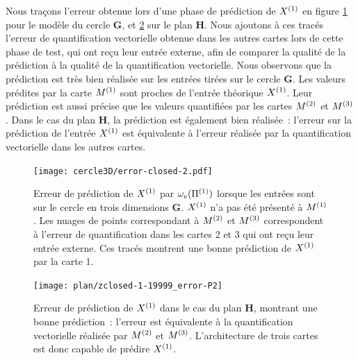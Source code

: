 \documentclass[../main]{subfiles}
\begin{document}
Nous traçons l'erreur obtenue lors d'une phase de prédiction de $X^{({1})}$ en figure \ref{fig:pred_cercle} pour le modèle du cercle \textbf{G}, et \ref{fig:plan3_pred} sur le plan \textbf{H}.
Nous ajoutons à ces tracés l'erreur de quantification vectorielle obtenue dans les autres cartes lors de cette phase de test, qui ont reçu leur entrée externe, afin de comparer la qualité de la prédiction à la qualité de la quantification vectorielle.
Nous observons que la prédiction est très bien réalisée sur les entrées tirées sur le cercle \textbf{G}. Les valeurs prédites par la carte $M^{({1})}$ sont proches de l'entrée théorique $X^{({1})}$. Leur prédiction est aussi précise que les valeurs quantifiées par les cartes $M^{({2})}$ et $M^{({3})}$.
Dans le cas du plan \textbf{H}, la prédiction est également bien réalisée~: l'erreur sur la prédiction de l'entrée $X^{({1})}$ est équivalente à l'erreur réalisée par la quantification vectorielle dans les autres cartes.

\begin{figure}
	\texttt{[image: cercle3D/error-closed-2.pdf]}
	\caption{Erreur de prédiction de $X^{({1})}$ par $\omega_e(\Pi^{({1})})$ lorsque les entrées sont sur le cercle en trois dimensions \textbf{G}. $X^{({1})}$ n'a pas été présenté à $M^{({1})}$.
	Les nuages de points correspondant à $M^{({2})}$ et $M^{({3})}$ correspondent à l'erreur de quantification dans les cartes 2 et 3 qui ont reçu leur entrée externe. Ces tracés montrent une bonne prédiction de $X^{({1})}$ par la carte 1. \label{fig:pred_cercle}}
\end{figure}

\begin{figure}
	\texttt{[image: plan/zclosed-1-19999\_error-P2]}	
	\caption{Erreur de prédiction de $X^{({1})}$ dans le cas du plan \textbf{H}, montrant une bonne prédiction~: l'erreur est équivalente à la quantification vectorielle réalisée par $M^{({2})}$ et $M^{({3})}$. L'architecture de trois cartes est donc capable de prédire $X^{({1})}$. 
	\label{fig:plan3_pred}}
\end{figure}
\end{document}
